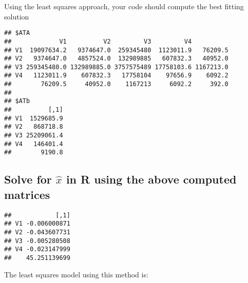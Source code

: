 \documentclass[]{article}
\newenvironment{Shaded}{\begin{snugshade}}{\end{snugshade}}
\newcommand{\KeywordTok}[1]{\textcolor[rgb]{0.13,0.29,0.53}{\textbf{{#1}}}}
\newcommand{\StringTok}[1]{\textcolor[rgb]{0.31,0.60,0.02}{{#1}}}
\newcommand{\NormalTok}[1]{{#1}}
\begin{document}
Using the least squares approach, your code should compute the best
fitting solution

\begin{Shaded}
\end{Shaded}

\begin{verbatim}
## $ATA
##             V1          V2         V3         V4          
## V1  19097634.2   9374647.0  259345480  1123011.9   76209.5
## V2   9374647.0   4857524.0  132989885   607832.3   40952.0
## V3 259345480.0 132989885.0 3757575489 17758103.6 1167213.0
## V4   1123011.9    607832.3   17758104    97656.9    6092.2
##        76209.5     40952.0    1167213     6092.2     392.0
## 
## $ATb
##          [,1]
## V1  1529685.9
## V2   868718.8
## V3 25209061.4
## V4   146401.4
##        9190.8
\end{verbatim}

\newpage

\subsection{\texorpdfstring{Solve for \(\hat{x}\) in R using the above
computed
matrices}{Solve for \textbackslash{}hat\{x\} in R using the above computed matrices}}\label{solve-for-hatx-in-r-using-the-above-computed-matrices-1}

\begin{Shaded}
\end{Shaded}

\begin{verbatim}
##            [,1]
## V1 -0.006000871
## V2 -0.043607731
## V3 -0.005280508
## V4 -0.023147999
##    45.251139699
\end{verbatim}

The least squares model using this method is:
\end{document}
